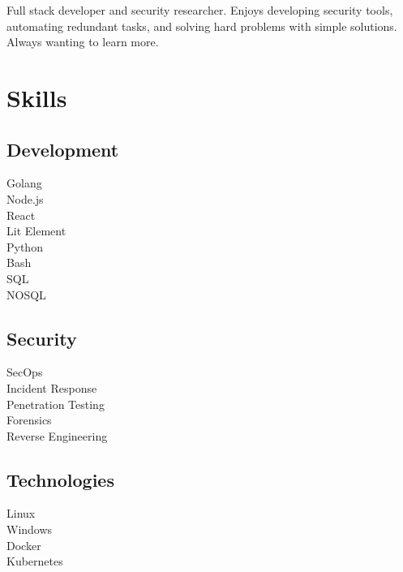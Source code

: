\documentclass[12pt]{resume}
\begin{document}
%
%



\sectionsep

Full stack developer and security researcher. Enjoys developing security tools, automating redundant tasks, and solving hard problems with simple solutions. Always wanting to learn more.

\sectionsep

%
%

\begin{minipage}[t]{0.33\textwidth} 


\section{Skills}

\subsection{Development}
\textbullet{} Golang \\
\textbullet{} Node.js \\
\textbullet{} React \\
\textbullet{} Lit Element \\
\textbullet{} Python \\
\textbullet{} Bash \\
\textbullet{} SQL \\
\textbullet{} NOSQL \\ 


\subsection{Security}
\textbullet{} SecOps \\
\textbullet{} Incident Response \\
\textbullet{} Penetration Testing \\
\textbullet{} Forensics \\
\textbullet{} Reverse Engineering \\


\subsection{Technologies}
\textbullet{} Linux \\
\textbullet{} Windows \\
\textbullet{} Docker \\
\textbullet{} Kubernetes \\




\end{minipage}
\end{document}
